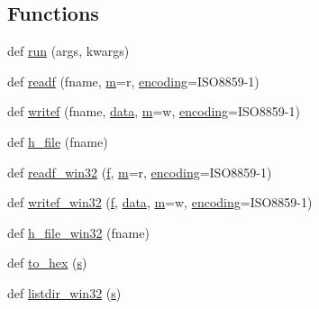 \subsection*{Functions}
\begin{DoxyCompactItemize}
\item 
def \hyperlink{namespacewaflib_1_1_utils_ada79e8c638bdd6c9c204f18498a20a63}{run} (args, kwargs)
\item 
def \hyperlink{namespacewaflib_1_1_utils_a16a319ee31916b25b8e03072430b7535}{readf} (fname, \hyperlink{layer3_8c_a4b8bfe70f28d6faddcb10d6ecf8c1989}{m}=\textquotesingle{}r\textquotesingle{}, \hyperlink{structencoding}{encoding}=\textquotesingle{}I\+S\+O8859-\/1\textquotesingle{})
\item 
def \hyperlink{namespacewaflib_1_1_utils_a9848332212684c408d95507d15fecd18}{writef} (fname, \hyperlink{lib_2expat_8h_ac39e72a1de1cb50dbdc54b08d0432a24}{data}, \hyperlink{layer3_8c_a4b8bfe70f28d6faddcb10d6ecf8c1989}{m}=\textquotesingle{}w\textquotesingle{}, \hyperlink{structencoding}{encoding}=\textquotesingle{}I\+S\+O8859-\/1\textquotesingle{})
\item 
def \hyperlink{namespacewaflib_1_1_utils_a47890c712be0f352eb1ac19d42785e36}{h\+\_\+file} (fname)
\item 
def \hyperlink{namespacewaflib_1_1_utils_ab1410cfe233104ff8ec8f6c1e09e94d7}{readf\+\_\+win32} (\hyperlink{checksum_8c_ae747d72a1a803f5ff4a4b2602857d93b}{f}, \hyperlink{layer3_8c_a4b8bfe70f28d6faddcb10d6ecf8c1989}{m}=\textquotesingle{}r\textquotesingle{}, \hyperlink{structencoding}{encoding}=\textquotesingle{}I\+S\+O8859-\/1\textquotesingle{})
\item 
def \hyperlink{namespacewaflib_1_1_utils_a92e436e191f6bdee42e2efe8d38b9614}{writef\+\_\+win32} (\hyperlink{checksum_8c_ae747d72a1a803f5ff4a4b2602857d93b}{f}, \hyperlink{lib_2expat_8h_ac39e72a1de1cb50dbdc54b08d0432a24}{data}, \hyperlink{layer3_8c_a4b8bfe70f28d6faddcb10d6ecf8c1989}{m}=\textquotesingle{}w\textquotesingle{}, \hyperlink{structencoding}{encoding}=\textquotesingle{}I\+S\+O8859-\/1\textquotesingle{})
\item 
def \hyperlink{namespacewaflib_1_1_utils_a132df823d6f99f8f1da4208d1014dd4f}{h\+\_\+file\+\_\+win32} (fname)
\item 
def \hyperlink{namespacewaflib_1_1_utils_aa9057390bd85e0d7085ef4918559878d}{to\+\_\+hex} (\hyperlink{lib_2expat_8h_a755339d27872b13735c2cab829e47157}{s})
\item 
def \hyperlink{namespacewaflib_1_1_utils_ac9a7b4f41109b8fff23f384df18dce13}{listdir\+\_\+win32} (\hyperlink{lib_2expat_8h_a755339d27872b13735c2cab829e47157}{s})

\end{DoxyCompactItemize}
